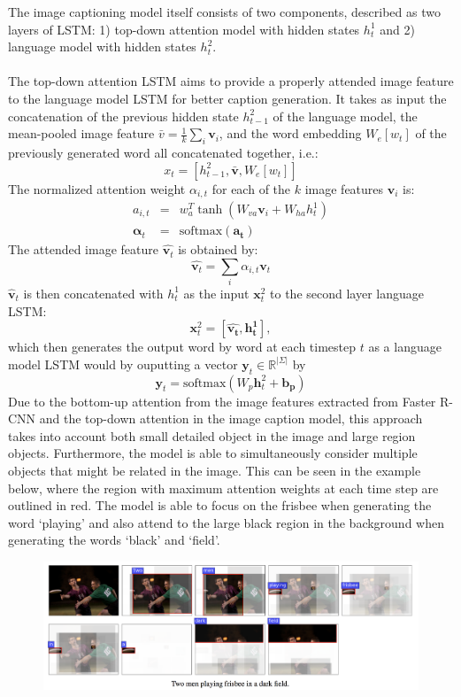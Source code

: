 \documentclass[12pt]{article}
\begin{document}
	The image captioning model itself consists of two components, described as two layers of LSTM: 1) top-down attention model with hidden states $h_t^1$ and 2) language model with hidden states $h_t^2$. \\
	\\
	The top-down attention LSTM aims to provide a properly attended image feature to the language model LSTM for better caption generation. It takes as input the concatenation of the previous hidden state $h_{t-1}^2$ of the language model, the mean-pooled image feature $\bar{v} = \frac{1}{k}\sum_{i}\mathbf{v}_i$, and the word embedding $W_e\left[w_t\right]$ of the previously generated word all concatenated together, i.e.:
	\[x_t = \left[h_{t-1}^2, \bm{\bar{v}}, W_e\left[w_t\right]\right]\]
	The normalized attention weight $\alpha_{i, t}$ for each of the $k$ image features $\mathbf{v}_i$ is:
	\begin{eqnarray*}
		a_{i, t} &=& w_a^T \tanh\left(W_{va}\bm{v}_i+W_{ha}h_t^1\right)\\
		\bm{\alpha}_{t} &=& \textrm{softmax}(\bm{a_t})
	\end{eqnarray*}
	The attended image feature $\hat{\bm{v}_t}$ is obtained by:
	\[\hat{\bm{v}_t} = \sum_{i} \alpha_{i, t} \bm{v}_t\]
	\noindent
	$\hat{\bm{v}}_t$ is then concatenated with $h_t^1$ as the input $\bm{x}_t^2$ to the second layer language LSTM:
	\[\bm{x}_t^2 = \left[\bm{\hat{\bm{v}_t}, h_t^1}\right],\]
	which then generates the output word by word at each timestep $t$ as a language model LSTM would by ouputting a vector $\bm{y}_t \in \mathbb{R}^{|\Sigma|}$ by
	\[\bm{y}_t = \textrm{softmax}(W_p\bm{h}_t^2 + \bm{b_p})\]
	Due to the bottom-up attention from the image features extracted from Faster R-CNN and the top-down attention in the image caption model, this approach takes into account both small detailed object in the image and large region objects. Furthermore, the model is able to simultaneously consider multiple objects that might be related in the image. This can be seen in the example below, where the region with maximum attention weights at each time step are outlined in red. The model is able to focus on the frisbee when generating the word `playing' and also attend to the large black region in the background when generating the words `black' and `field'.
	\begin{figure}[H]
		\centering
		\includegraphics[width=\linewidth]{figures/attention-example}
	\end{figure}
\end{document}
